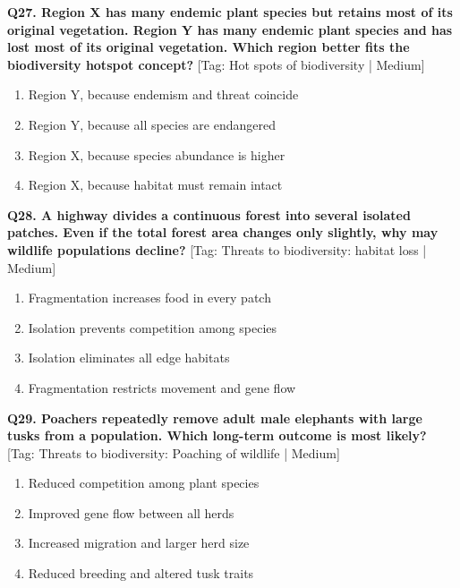 \noindent\textbf{Q27. Region X has many endemic plant species but retains most of its original vegetation. Region Y has many endemic plant species and has lost most of its original vegetation. Which region better fits the biodiversity hotspot concept?} \hfill [Tag: Hot spots of biodiversity | Medium]
\begin{enumerate}[label=(\alph*),topsep=2pt,itemsep=1pt,partopsep=0pt,parsep=0pt]
    \item {Region Y, because endemism and threat coincide}
    \item {Region Y, because all species are endangered}
    \item {Region X, because species abundance is higher}
    \item {Region X, because habitat must remain intact}
\end{enumerate}
\vspace{2mm}

\noindent\textbf{Q28. A highway divides a continuous forest into several isolated patches. Even if the total forest area changes only slightly, why may wildlife populations decline?} \hfill [Tag: Threats to biodiversity: habitat loss | Medium]
\begin{enumerate}[label=(\alph*),topsep=2pt,itemsep=1pt,partopsep=0pt,parsep=0pt]
    \item {Fragmentation increases food in every patch}
    \item {Isolation prevents competition among species}
    \item {Isolation eliminates all edge habitats}
    \item {Fragmentation restricts movement and gene flow}
\end{enumerate}
\vspace{2mm}

\noindent\textbf{Q29. Poachers repeatedly remove adult male elephants with large tusks from a population. Which long-term outcome is most likely?} \hfill [Tag: Threats to biodiversity: Poaching of wildlife | Medium]
\begin{enumerate}[label=(\alph*),topsep=2pt,itemsep=1pt,partopsep=0pt,parsep=0pt]
    \item {Reduced competition among plant species}
    \item {Improved gene flow between all herds}
    \item {Increased migration and larger herd size}
    \item {Reduced breeding and altered tusk traits}
\end{enumerate}
\vspace{2mm}

